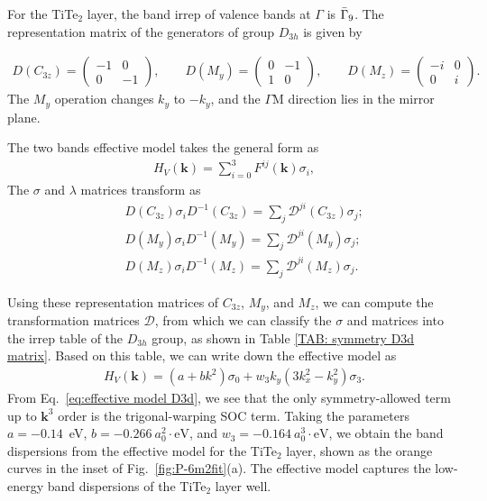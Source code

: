\documentclass[aps, preprint, prb,]{revtex4-2}
\def\kk{\mathbf{k}}
\begin{document}
For the TiTe$_2$ layer, the band irrep of valence bands at $\Gamma$ is $\Bar{\Gamma}_9$. The representation matrix of the generators of group $D_{3h}$ is given by

\begin{eqnarray}
D(C_{3z})=
\begin{pmatrix}
-1 & 0\\
0 & -1
\end{pmatrix},\qquad
D(M_y)=
\begin{pmatrix}
0 & -1\\
1 & 0
\end{pmatrix},\qquad
D(M_z)=
\begin{pmatrix}
-i & 0\\
0 & i
\end{pmatrix}.
\end{eqnarray}
The $M_y$ operation changes $k_y$ to $-k_y$, and the $\Gamma\mathrm{M}$ direction lies in the mirror plane.

The two bands effective model takes the general form as
\begin{eqnarray}
    H_{V}(\kk)=\sum^{3}_{i=0}F^{ij}(\kk)\sigma_i,
\end{eqnarray}
 The $\sigma$ and $\lambda$ matrices transform as
\begin{eqnarray}
  &&D(C_{3z}) \sigma_i D^{-1}(C_{3z})=\sum_j\mathcal{D}^{ji}(C_{3z}) \sigma_j; 
  \\
  && D(M_{y}) \sigma_i D^{-1}(M_{y})=\sum_j\mathcal{D}^{ji}(M_{y}) \sigma_j;
  \\
   &&D(M_{z}) \sigma_i D^{-1}(M_{z})=\sum_j\mathcal{D}^{ji}(M_{z}) \sigma_j.
\end{eqnarray}


Using these representation matrices of $C_{3z}$, $M_y$, and $M_z$, we can compute the transformation matrices $\mathcal{D}$, from which we can classify the $\sigma$ and matrices into the irrep table of the $D_{3h}$ group, as shown in Table \ref{TAB: symmetry D3d matrix}.  Based on this table, we can write down the effective model as 
\begin{eqnarray} \label{eq:effective model D3d}
     H_{V}(\kk)=(a+bk^2)\sigma_0+w_3 k_y(3k_x^2-k_y^2) \sigma_3.
\end{eqnarray}
From Eq.~\ref{eq:effective model D3d}, we see that the only symmetry-allowed term up to $\kk^3$ order is the trigonal-warping SOC term. Taking the parameters $a=-0.14$~eV, $b=-0.266~a_0^2 \cdot \mathrm{eV}$, and $w_3=-0.164~a_0^3 \cdot \mathrm{eV}$, we obtain the band dispersions from the effective model for the TiTe$_2$ layer, shown as the orange curves in the inset of Fig.~\ref{fig:P-6m2fit}(a). The effective model captures the low-energy band dispersions of the TiTe$_2$ layer well.
\end{document}

